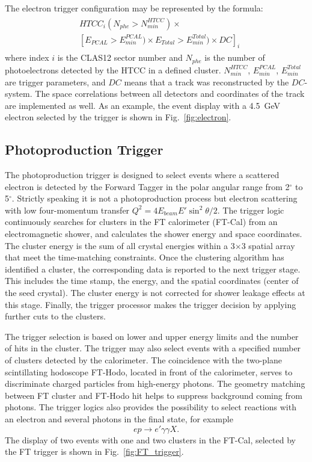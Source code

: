 The electron trigger configuration may be represented by the formula:
\begin{align} 
\label{eq:em_trg_formula}
\begin{split}
 & HTCC_i(N_{phe}{>}N^{HTCC}_{min})\times\\
 & [E_{PCAL}{>}E^{PCAL}_{min}) \times E_{Total}{>}E^{Total}_{min})\times  DC]_i
 \end{split}
\end{align}
\noindent
where index $i$ is the CLAS12 sector number and $N_{phe}$ is the number of photoelectrons detected by the
HTCC in a defined cluster. $N^{HTCC}_{min}$,  $E^{PCAL}_{min}$, $ E^{Total}_{min}$ are trigger parameters, and
$DC$ means that a track was reconstructed by the $DC$-system. The space correlations between all detectors
and coordinates of the track are implemented as well. As an example, the event display with a 4.5~GeV electron
selected by the trigger is shown in Fig.~\ref{fig:electron}.

\subsection{Photoproduction Trigger}
\label{sec:photoproduction_trigger}

The photoproduction trigger is designed to select events where a scattered electron is detected by the
Forward Tagger in the polar angular range from 2$^\circ$ to 5$^\circ$. Strictly speaking it is not a
photoproduction process but electron scattering with low four-momentum transfer
$Q^2=4E_{beam}E'\sin^2\theta/2$. The trigger logic continuously searches for clusters in the FT calorimeter
(FT-Cal) from an electromagnetic shower, and calculates the shower energy and space coordinates. The cluster
energy is the sum of all  crystal energies within a 3$\times$3 spatial array that meet the time-matching
constraints. Once the clustering algorithm  has identified a cluster, the corresponding data is reported to the
next trigger stage. This includes the time stamp, the energy, and the spatial coordinates (center of the seed
crystal). The cluster energy is not corrected for shower leakage effects at this stage. Finally, the trigger
processor makes the trigger decision by applying further cuts to the clusters.

The trigger selection is based on lower and upper energy limits and the number of hits in the cluster. The trigger
may also select events with a specified number of clusters detected by the calorimeter. The coincidence with
the two-plane scintillating hodoscope FT-Hodo, located in front of the calorimeter, serves to discriminate
charged particles from high-energy photons. The geometry matching between FT cluster and FT-Hodo hit
helps to suppress background coming from photons.  The trigger logics also provides  the possibility to select
reactions with an electron and several photons in the final state, for example
$$
ep\to e'\gamma\gamma X.
$$
\noindent
The display of two events with  one and two clusters in the FT-Cal, selected by the FT trigger is shown in
Fig.~\ref{fig:FT_trigger}.

